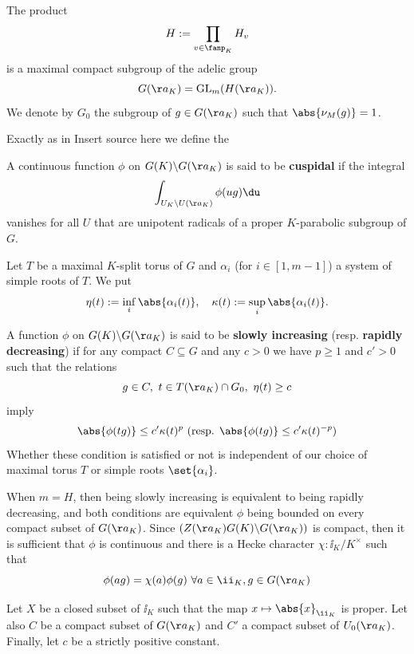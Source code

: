 \documentclass[11pt, x11names, openany]{book}
\begin{document}
The product
\begin{equation*}
  H := \prod_{v \in \fanp_K} H_v
\end{equation*}
is a maximal compact subgroup of the adelic group
\begin{equation*}
  G(\aa_K) = \GL_m(H(\aa_K)).
\end{equation*}
We denote by $G_0$ the subgroup of $g \in G(\aa_K)$ such that $\abs{\nu_M(g)} = 1$.

Exactly as in {\color{red} Insert source here} we define the 


\begin{defn}
\label{def: cuspidal func on G_A/G_K}
A continuous function $\phi$ on $G(K) \backslash G(\aa_K)$ is said to be \textbf{cuspidal} if the integral
\begin{equation*}
  \int_{U_K \backslash U(\aa_K)} \phi(u g) \du
\end{equation*}
vanishes for all $U$ that are unipotent radicals of a proper $K$-parabolic subgroup of $G$.
\end{defn}

Let $T$ be a maximal $K$-split torus of $G$ and $\alpha_i$ (for $i \in [1, m-1]$) a system of simple roots of $T$. We put
\begin{equation*}
  \eta(t) := \inf_{i} \abs{\alpha_i(t)}, \quad \kappa(t) := \sup_i \abs{\alpha_i(t)}.
\end{equation*}

\begin{defn}
\label{def: slowly increasing + rapidly decreasing function on G_A/G_K}
A function $\phi$ on $G(K) \backslash G(\aa_K)$ is said to be \textbf{slowly increasing} (resp. \textbf{rapidly decreasing}) if for any compact $C \subseteq G$ and any $c > 0$ we have $p \geq 1$ and $c' > 0$ such that the relations
\begin{equation*}
  g \in C, \ t \in T(\aa_K) \cap G_0, \ \eta(t) \geq c
\end{equation*}
imply
\begin{equation*}
  \abs{\phi(tg)} \leq c' \kappa(t)^{p} \text{ (resp. }  \abs{\phi(tg)} \leq c' \kappa(t)^{-p} \text{)}
\end{equation*}
Whether these  condition is satisfied or not is independent of our choice of maximal torus $T$ or simple roots $\set{\alpha_i}$.
\end{defn}

When $m = H$, then being slowly increasing is equivalent to being rapidly decreasing, and both conditions are equivalent $\phi$ being bounded on every compact subset of $G(\aa_K)$. Since $(Z(\aa_K)G(K)\backslash G(\aa_K))$ is compact, then it is sufficient that $\phi$ is continuous and there is a Hecke character $\chi: \ii_K/K^\times$ such that
\begin{equation*}
  \phi(ag) = \chi(a) \phi(g) \ \forall a \in \ii_K, g \in G(\aa_K)
\end{equation*}

Let $X$ be a closed subset of $\ii_K$ such that the map $x \mapsto \abs{x}_{\ii_K}$ is proper. Let also $C$ be a compact subset of $G(\aa_K)$ and $C'$ a compact subset of $U_0(\aa_K)$. Finally, let $c$ be a strictly positive constant.\\
\end{document}
